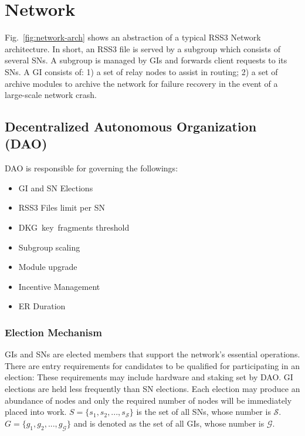 \section{Network}

Fig.~\ref{fig:network-arch} shows an abstraction of a typical RSS3 Network architecture. In short, an RSS3 file is served by a subgroup which consists of several SNs. A subgroup is managed by GIs and forwards client requests to its SNs. A GI consists of: 1) a set of relay nodes to assist in routing; 2) a set of archive modules to archive the network for failure recovery in the event of a large-scale network crash.

\subsection{Decentralized Autonomous Organization (DAO)}

DAO is responsible for governing the followings:
\begin{multicols}{2}
    \begin{itemize}
        \item GI and SN Elections
        \item RSS3 Files limit per SN
        \item \mbox{DKG key fragments} threshold
        \item Subgroup scaling
        \item Module upgrade
        \item Incentive Management
        \item ER Duration
    \end{itemize}
\end{multicols}

\subsubsection{Election Mechanism}

GIs and SNs are elected members that support the network's essential operations. There are entry requirements for candidates to be qualified for participating in an election: These requirements may include hardware and staking set by DAO. GI elections are held less frequently than SN elections. Each election may produce an abundance of nodes and only the required number of nodes will be immediately placed into work. $S=\{s_1, s_2,...,s_{\mathcal{S}}\}$ is the set of all SNs, whose number is $\mathcal{S}$. $G=\{g_1, g_2, ..., g_{\mathcal{G}}\}$ and is denoted as the set of all GIs, whose number is $\mathcal{G}$.

